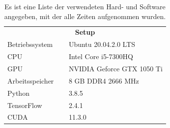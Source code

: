 \begin{table}
	\centering
	\caption{Es ist eine Liste der verwendeten Hard- und Software angegeben, mit der alle Zeiten aufgenommen wurden.}
	\begin{tabular}{ll}
		\multicolumn{2}{c}{\textbf{Setup}} \\[5pt]
		Betriebssystem $\quad$& Ubuntu 20.04.2.0 LTS \\
		CPU & Intel Core  i5-7300HQ \\
		GPU & NVIDIA Geforce GTX 1050 Ti \\
		Arbeitsspeicher & 8 GB DDR4 2666 MHz \\
		Python & 3.8.5 \\
		TensorFlow & 2.4.1 \\
		CUDA & 11.3.0 \\
	\end{tabular}
	\label{hardware}
\end{table}
